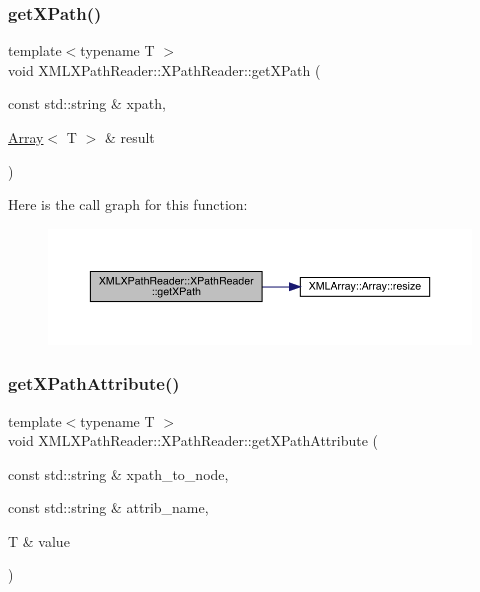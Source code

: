 \subsubsection{\texorpdfstring{getXPath()}{getXPath()}\hspace{0.1cm}{\footnotesize\ttfamily [9/9]}}
{\footnotesize\ttfamily template$<$typename T $>$ \\
void X\+M\+L\+X\+Path\+Reader\+::\+X\+Path\+Reader\+::get\+X\+Path (\begin{DoxyParamCaption}\item[{const std\+::string \&}]{xpath,  }\item[{\mbox{\hyperlink{classXMLArray_1_1Array}{Array}}$<$ T $>$ \&}]{result }\end{DoxyParamCaption})\hspace{0.3cm}{\ttfamily [inline]}}

Here is the call graph for this function\+:
\nopagebreak
\begin{figure}[H]
\begin{center}
\leavevmode
\includegraphics[width=350pt]{d3/d5a/classXMLXPathReader_1_1XPathReader_a2c16b804ab7842a5bab7a8fe3f433437_cgraph}
\end{center}
\end{figure}
\mbox{\label{classXMLXPathReader_1_1XPathReader_a0a5ca67826c2c8fdad784a3bbbba4b3c}} 
\subsubsection{\texorpdfstring{getXPathAttribute()}{getXPathAttribute()}\hspace{0.1cm}{\footnotesize\ttfamily [1/3]}}
{\footnotesize\ttfamily template$<$typename T $>$ \\
void X\+M\+L\+X\+Path\+Reader\+::\+X\+Path\+Reader\+::get\+X\+Path\+Attribute (\begin{DoxyParamCaption}\item[{const std\+::string \&}]{xpath\+\_\+to\+\_\+node,  }\item[{const std\+::string \&}]{attrib\+\_\+name,  }\item[{T \&}]{value }\end{DoxyParamCaption})\hspace{0.3cm}{\ttfamily [inline]}}

